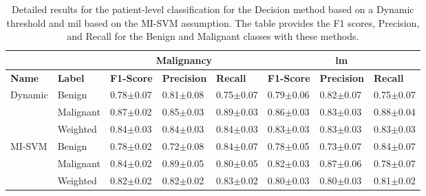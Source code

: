 \documentclass[journal,article,submit,moreauthors,pdftex, applsci]{Definitions/mdpi}
\begin{document}
\par
\begin{table}[H]
    \centering
    \begin{tabular}{lllll||lll}
                                &                   & \multicolumn{3}{c}{\textbf{Malignancy}}                               & \multicolumn{3}{c}{\textbf{\ac{lm}}}                                  \\ \hline
    \textbf{Name}               & \textbf{Label}    & \textbf{F1-Score}     & \textbf{Precision}    & \textbf{Recall}       & \textbf{F1-Score}     & \textbf{Precision}    & \textbf{Recall}       \\ \hline
    \multirow{3}{*}{Dynamic}    & Benign            & 0.78$\pm$0.07         & 0.81$\pm$0.08         & 0.75$\pm$0.07         & 0.79$\pm$0.06         & 0.82$\pm$0.07         & 0.75$\pm$0.07         \\ \cline{2-8}  
                                & Malignant         & 0.87$\pm$0.02         & 0.85$\pm$0.03         & 0.89$\pm$0.03         & 0.86$\pm$0.03         & 0.83$\pm$0.03         & 0.88$\pm$0.04         \\ \cline{2-8} 
                                & Weighted          & 0.84$\pm$0.03         & 0.84$\pm$0.03         & 0.84$\pm$0.03         & 0.83$\pm$0.03         & 0.83$\pm$0.03         & 0.83$\pm$0.03         \\ \hline
    \multirow{3}{*}{MI-SVM}     & Benign            & 0.78$\pm$0.02         & 0.72$\pm$0.08         & 0.84$\pm$0.07         & 0.78$\pm$0.05         & 0.73$\pm$0.07         & 0.84$\pm$0.07         \\ \cline{2-8}
                                & Malignant         & 0.84$\pm$0.02         & 0.89$\pm$0.05         & 0.80$\pm$0.05         & 0.82$\pm$0.03         & 0.87$\pm$0.06         & 0.78$\pm$0.07         \\ \cline{2-8} 
                                & Weighted          & 0.82$\pm$0.02         & 0.82$\pm$0.02         & 0.83$\pm$0.02         & 0.80$\pm$0.03         & 0.80$\pm$0.03         & 0.81$\pm$0.02         \\ \hline 
    \end{tabular}    
    \caption{Detailed results for the patient-level classification for the Decision method based on a Dynamic threshold and \ac{mil} based on the MI-SVM assumption. The table provides the F1 scores, Precision, and Recall for the Benign and Malignant classes with these methods.}
    \label{tab:patient_results_details}
\end{table}\par
\end{document}
